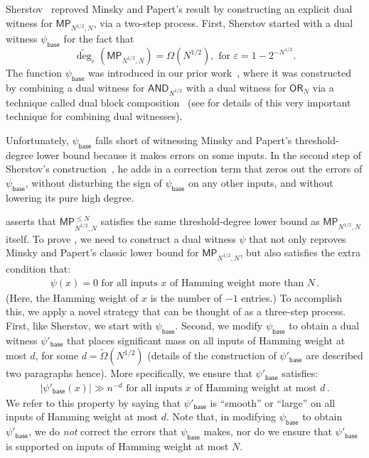 \documentclass{toc}
\newcommand{\OR}{\mathsf{ OR}}
\newcommand{\eps}{\varepsilon}
\newcommand{\adeg}{\widetilde{\operatorname{deg}}}
\newcommand{\AND}{\mathsf{AND}}
\begin{document}
Sherstov~\cite{sherstov15} reproved Minsky and Papert's result by constructing an explicit dual witness for $\mathsf{MP}_{N^{1/2}, N}$, via
a two-step process. First, Sherstov started with a dual witness $\psi_{\textsf{base}}$ for the fact that 
$$\adeg_{\eps}(\mathsf{MP}_{N^{1/2}, N}) =\Omega(N^{1/2}), \text{ for } \eps=1-2^{-N^{1/2}}.$$
The function $\psi_{\textsf{base}}$ was introduced
in our prior work~\cite{bt14}, where it was constructed by combining a dual witness for $\AND_{N^{1/2}}$ with
a dual witness for $\OR_{N}$ via a technique called dual block composition~\cite{shizhu, lee, sherstovhalfspaces1} (see  for details of this 
very important technique for combining dual witnesses). 

Unfortunately, $\psi_{\textsf{base}}$ falls short of witnessing Minsky and Papert's threshold-degree %
lower bound
because it makes errors on some inputs. In the second step of Sherstov's construction~\cite{sherstov15}, he adds in a correction term that zeros out the errors of $\psi_{\textsf{base}}$, without disturbing
the sign of $\psi_{\textsf{base}}$ on any other inputs, and without lowering its pure high degree.

 asserts that $\mathsf{MP}_{N^{1/2}, N}^{\leq N}$ satisfies the same threshold-degree %
lower bound as 
$\mathsf{MP}_{N^{1/2}, N}$ itself. To prove , we need to construct a dual witness $\psi$ that not only reproves Minsky and Papert's
classic lower bound for $\mathsf{MP}_{N^{1/2}, N}$, but also satisfies the extra condition that:
\begin{align} \label{howhowhow} \psi(x)=0 \text{ for all inputs } x \text{ of Hamming weight more than } N\,.\end{align}
(Here, the Hamming weight of $x$ is the number of $-1$ entries.) To accomplish this, we apply a novel strategy that can be thought
of as a three-step process. First, like Sherstov, we start with $\psi_{\textsf{base}}$. Second, we modify $\psi_{\textsf{base}}$
to obtain a dual witness $\psi'_{\textsf{base}}$ that places significant mass on all inputs of Hamming weight at most $d$, for some $d=\tilde{\Omega}(N^{1/2})$
(details of the construction of $\psi'_{\textsf{base}}$ are described two paragraphs hence).
More specifically, we ensure that $\psi'_{\textsf{base}}$  satisfies:
%
\begin{align} \label{noreallythispaperisntgood} |\psi'_{\textsf{base}}(x)| \gg n^{-d}  \text{ for all inputs } x \text{ of Hamming weight at most } d\,. \end{align}
%
We refer to this property by saying that $\psi'_{\textsf{base}}$ is ``smooth'' or ``large'' on all inputs of Hamming weight at most $d$.
Note that, in modifying $\psi_{\textsf{base}}$ to obtain $\psi'_{\textsf{base}}$, we do \emph{not} correct the errors that $\psi_{\textsf{base}}$ makes, nor do we ensure that $\psi'_{\textsf{base}}$
is supported on inputs of Hamming weight at most $N$.
\end{document}
